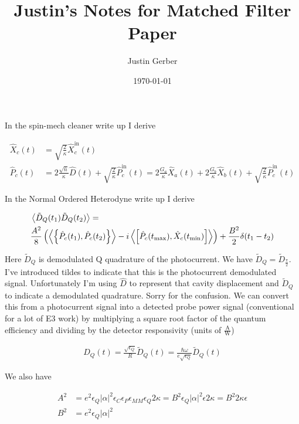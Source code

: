 \documentclass[12pt]{article}
\begin{document}
\title{Justin's Notes for Matched Filter Paper}
\author{Justin Gerber}
\date{\today}
\maketitle

In the spin-mech cleaner write up I derive

\begin{align}
\hat{X}_c(t) &= \sqrt{\frac{2}{\kappa}} \hat{X}_c^{\text{in}}(t)\\
\hat{P}_c(t) &= 2 \frac{\sqrt{\bar{n}}}{\kappa} \hat{D}(t) + \sqrt{\frac{2}{\kappa}}\hat{P}_c^{\text{in}}(t) = 2 \frac{G_a}{\kappa} \hat{X}_a(t) + 2 \frac{G_b}{\kappa} \hat{X}_b(t) + \sqrt{\frac{2}{\kappa}}\hat{P}_c^{\text{in}}(t)
\end{align}

In the Normal Ordered Heterodyne write up I derive

\begin{align}
&\Braket{\tilde{D}_Q(t_1)\tilde{D}_Q(t_2)} =\\ &\frac{A^2}{8}\left(\Braket{\left\{\hat{P}_c(t_1),\hat{P}_c(t_2)\right\}} - i\Braket{\left[\hat{P}_c(t_{\text{max}}),\hat{X}_c(t_{\text{min}})\right]}\right) + \frac{B^2}{2}\delta(t_1-t_2)
\end{align}

Here $\tilde{D}_Q$ is demodulated Q quadrature of the photocurrent. We have $\tilde{D}_Q = \tilde{D}_{\frac{\pi}{2}}$. I've introduced tildes to indicate that this is the photocurrent demodulated signal. Unfortunately I'm using $\hat{D}$ to represent that cavity displacement and $\tilde{D}_Q$ to indicate a demodulated quadrature. Sorry for the confusion. We can convert this from a photocurrent signal into a detected probe power signal (conventional for a lot of E3 work) by multiplying a square root factor of the quantum efficiency and dividing by the detector responsivity (units of $\frac{\text{A}}{\text{W}}$)

\begin{align}
D_Q(t) = \frac{\sqrt{\epsilon_Q}}{R} \tilde{D}_Q(t) = \frac{\hbar \omega}{e \sqrt{\epsilon_Q}} \tilde{D}_Q(t)
\end{align}

We also have

\begin{align}
A^2 &= e^2 \epsilon_Q |\alpha|^2 \epsilon_C \epsilon_P \epsilon_{MM} \epsilon_Q 2 \kappa = B^2 \epsilon_Q |\alpha|^2 \epsilon 2\kappa = B^2 2\kappa \epsilon\\
B^2 &= e^2 \epsilon_Q |\alpha|^2
\end{align}
\end{document}

